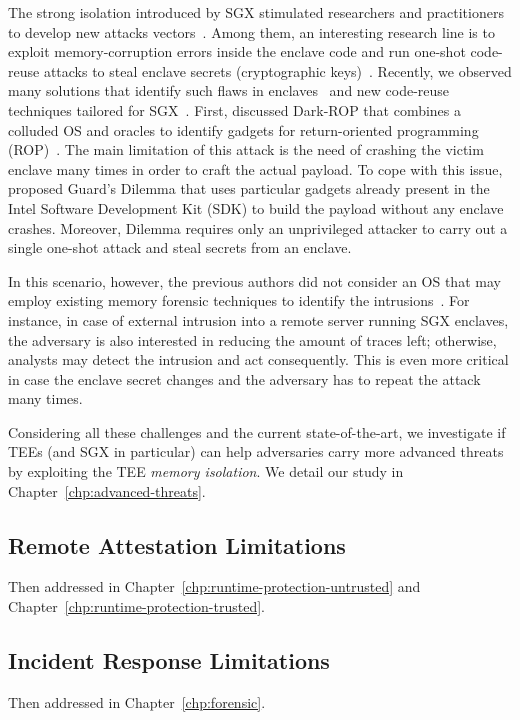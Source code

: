 The strong isolation introduced by SGX stimulated researchers and practitioners 
to develop new attacks 
vectors~\citep{foreshadow,Murdock2019plundervolt,203183,lee2017hacking}.
Among them, an interesting research line is to exploit memory-corruption 
errors inside the enclave code and run one-shot code-reuse attacks to steal 
enclave secrets (\eg cryptographic keys)~\citep{geometry2007}.
Recently, we observed many solutions that identify such flaws in 
enclaves~\citep{teerex,tale-two-worlds} and new code-reuse techniques 
tailored for SGX~\citep{lee2017hacking,biondo2018guard}.
First, \cite{lee2017hacking} discussed Dark-ROP that combines a colluded OS and 
oracles to identify gadgets for return-oriented programming 
(ROP)~\citep{geometry2007}.
The main limitation of this attack is the need of crashing the victim
enclave many times in order to craft the actual payload.
To cope with this issue, \cite{biondo2018guard} proposed Guard's 
Dilemma that uses particular gadgets already present in the Intel Software 
Development Kit (SDK) to build the payload without any enclave crashes.
Moreover, Dilemma requires only an unprivileged attacker to carry out a 
single one-shot attack and steal secrets from an enclave.


In this scenario, however, the previous authors did not consider an OS that may 
employ existing memory forensic techniques to identify the 
intrusions~\citep{stancill2013check,polychronakis2011rop,kittel2015counteracting,Graziano:2016:RFA:2897845.2897894}.
For instance, in case of external intrusion into a remote server running SGX 
enclaves, the adversary is also interested in reducing the amount of traces 
left; otherwise, analysts may detect the intrusion and act consequently.
This is even more critical in case the enclave secret changes and the adversary 
has to repeat the attack many times.

Considering all these challenges and the current state-of-the-art, we 
investigate if TEEs (and SGX in particular) can help adversaries carry more 
advanced threats by exploiting the TEE \emph{memory isolation}.
We detail our study in Chapter~\ref{chp:advanced-threats}.

\subsection{Remote Attestation Limitations}
\label{ssec:contribution3}

Then addressed in Chapter~\ref{chp:runtime-protection-untrusted} and
Chapter~\ref{chp:runtime-protection-trusted}.

\subsection{Incident Response Limitations}
\label{ssec:contribution4}

Then addressed in Chapter~\ref{chp:forensic}.

